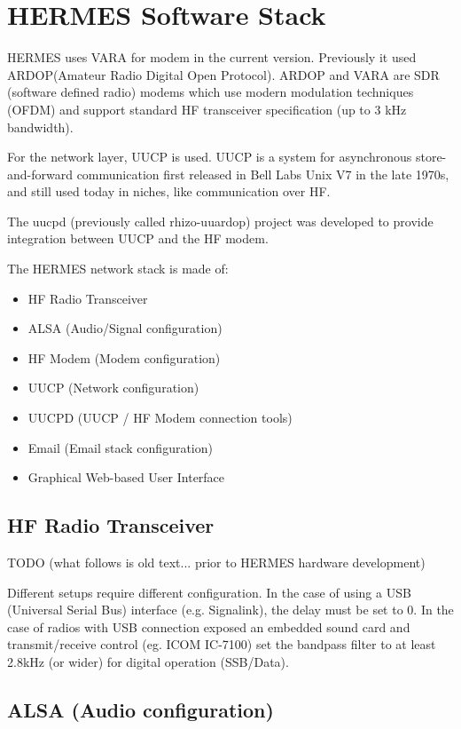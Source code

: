 \documentclass[11pt,a4paper]{article}
\begin{document}
\section{HERMES Software Stack}

HERMES uses VARA for modem in the current version. Previously it used ARDOP(Amateur Radio Digital Open Protocol).
ARDOP and VARA are
SDR (software defined radio) modems which use modern modulation techniques (OFDM) and support
standard HF transceiver specification (up to 3 kHz bandwidth).

For the network layer, UUCP is used. UUCP is a system for asynchronous
store-and-forward communication first released in Bell Labs Unix V7 in
the late 1970s, and still used today in niches, like communication over HF.

The uucpd (previously called rhizo-uuardop) project was developed to provide
integration between UUCP and the HF modem.

The HERMES network stack is made of:
\begin{itemize}
\item HF Radio Transceiver
\item ALSA (Audio/Signal configuration)
\item HF Modem (Modem configuration)
\item UUCP (Network configuration)
\item UUCPD (UUCP / HF Modem connection tools)
\item Email (Email stack configuration)
\item Graphical Web-based User Interface
\end{itemize}

\subsection{HF Radio Transceiver}

TODO (what follows is old text... prior to HERMES hardware development)

Different setups require different configuration. In the case of using a USB
(Universal Serial Bus) interface (e.g. Signalink), the delay must be set to
0. In the case of radios with USB connection exposed an embedded sound
card and transmit/receive control (eg. ICOM IC-7100) set the bandpass
filter to at least 2.8kHz (or wider) for digital operation (SSB/Data).

\subsection{ALSA (Audio configuration)}
\end{document}
